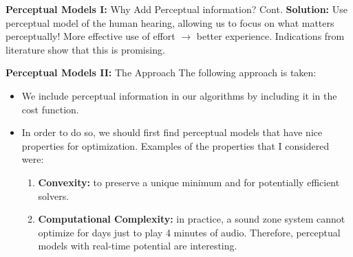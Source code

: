 \documentclass[aspectratio=169]{beamer}
\renewcommand{\cite}[1]{\footnote<.->[frame]{\fullcite{#1}}}
\begin{document}
\begin{frame}{\textbf{Perceptual Models I:} Why Add Perceptual information? Cont.}
    \textbf{Solution:} Use perceptual model of the human hearing, allowing us to focus on what matters perceptually! 
    More effective use of effort $\rightarrow$ better experience.
    Indications from literature show that this is promising.
\end{frame}


\begin{frame}{\textbf{Perceptual Models II:} The Approach}
    The following approach is taken:
    \begin{itemize}
        \item We include perceptual information in our algorithms by including it in the cost function.
        \item In order to do so, we should first find perceptual models that have nice properties for optimization.
            Examples of the properties that I considered were:
            \begin{enumerate}
                \item \textbf{Convexity:} to preserve a unique minimum and for potentially efficient solvers.
                \item \textbf{Computational Complexity:} in practice, a sound zone system cannot optimize for days just to play 4 minutes of audio.
                    Therefore, perceptual models with real-time potential are interesting.
            \end{enumerate}
    \end{itemize}
\end{frame}

\end{document}
